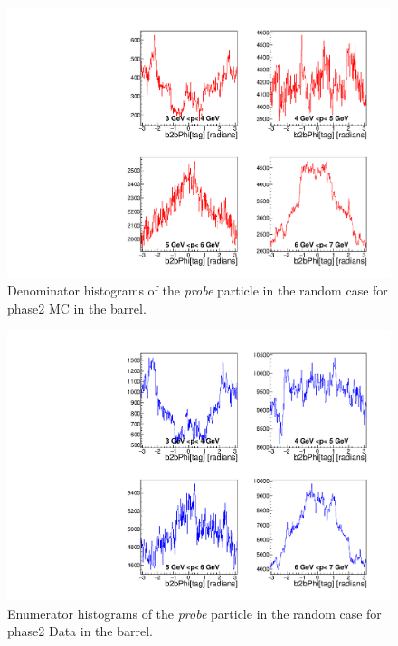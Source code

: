 \documentclass[a4paper,11pt,twosided,final,german,openbib,pdftex,listof=totoc,bibliography=totoc]{scrbook}
\begin{document}
\begin{appendix}
\begin{figure}[!htbp]
	\centering
	\includegraphics[width=\textwidth]{Plots/master/xPMPhiRandomBarrelD_MC}
	\caption[Momentum $\phi$ Random Barrel Denominator Histogram Phase2 MC]{Denominator histograms of the \textit{probe} particle in the random case for phase2 MC in the barrel.}
	\label{plt:PMPhiRandomBarrelD_MC}
\end{figure}


\begin{figure}[!htbp]
	\centering
	\includegraphics[width=\textwidth]{Plots/master/xPMPhiRandomBarrelE_Data}
	\caption[Momentum $\phi$ Random Barrel Enumerator Histogram Phase2 Data]{Enumerator histograms of the \textit{probe} particle in the random case for phase2 Data in the barrel.}
	\label{plt:PMPhiRandomBarrelE_Data}
\end{figure}


\end{appendix}
\end{document}
